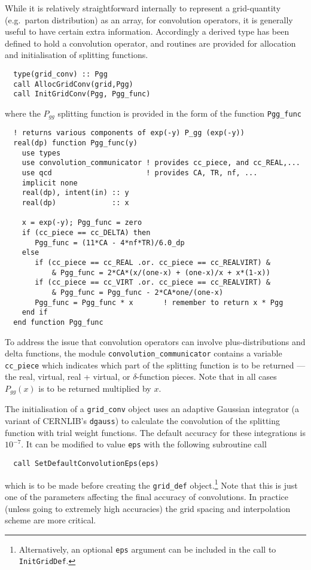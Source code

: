 \documentclass[12pt]{article}
\newcommand{\ttt}[1]{\texttt{#1}}
\begin{document}
While it is relatively straightforward internally to represent a
grid-quantity (e.g.\ parton distribution) as an array, for convolution
operators, it is generally useful to have certain extra
information. Accordingly a derived type has been defined to hold a
convolution operator, and routines are provided for allocation and
initialisation of splitting functions.
\begin{verbatim}
  type(grid_conv) :: Pgg
  call AllocGridConv(grid,Pgg)
  call InitGridConv(Pgg, Pgg_func)
\end{verbatim}
where the $P_{gg}$ splitting function is provided in the form of the
function \texttt{Pgg\_func}
\begin{verbatim}
  ! returns various components of exp(-y) P_gg (exp(-y))
  real(dp) function Pgg_func(y)
    use types
    use convolution_communicator ! provides cc_piece, and cc_REAL,...
    use qcd                      ! provides CA, TR, nf, ...
    implicit none
    real(dp), intent(in) :: y
    real(dp)             :: x

    x = exp(-y); Pgg_func = zero
    if (cc_piece == cc_DELTA) then 
       Pgg_func = (11*CA - 4*nf*TR)/6.0_dp
    else
       if (cc_piece == cc_REAL .or. cc_piece == cc_REALVIRT) & 
           & Pgg_func = 2*CA*(x/(one-x) + (one-x)/x + x*(1-x))
       if (cc_piece == cc_VIRT .or. cc_piece == cc_REALVIRT) & 
           & Pgg_func = Pgg_func - 2*CA*one/(one-x)
       Pgg_func = Pgg_func * x       ! remember to return x * Pgg
    end if
  end function Pgg_func
\end{verbatim}
To address the issue that convolution operators can involve
plus-distributions and delta functions, the module
\texttt{convolution\_communicator} contains a variable
\texttt{cc\_piece} which indicates which part of the splitting
function is to be returned --- the real, virtual, real + virtual, or
$\delta$-function pieces. Note that in all cases $P_{gg}(x)$ is to be
returned multiplied by $x$.

The initialisation of a \texttt{grid\_conv} object uses an adaptive
Gaussian integrator (a variant of CERNLIB's \texttt{dgauss}) to
calculate the convolution of the splitting function with trial weight
functions. The default accuracy for these integrations is $10^{-7}$.
It can be modified to value \texttt{eps} with the following subroutine
call
\begin{verbatim}
  call SetDefaultConvolutionEps(eps)
\end{verbatim}
which is to be made before creating the \ttt{grid\_def}
object.\footnote{Alternatively, an optional \ttt{eps} argument can be
  included in the call to \ttt{InitGridDef}.}  Note that this is just
one of the parameters affecting the final accuracy of convolutions. In
practice (unless going to extremely high accuracies) the grid spacing
and interpolation scheme are more critical.
\end{document}
